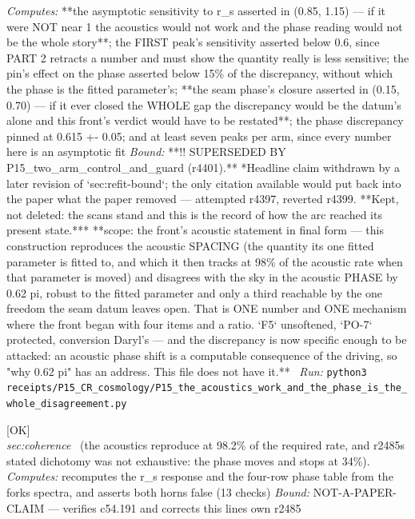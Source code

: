 \begin{description}
\emph{Computes:} **the asymptotic sensitivity to r\_s asserted in (0.85, 1.15) --- if it were NOT near 1 the acoustics would not work and the phase reading would not be the whole story**; the FIRST peak's sensitivity asserted below 0.6, since PART 2 retracts a number and must show the quantity really is less sensitive; the pin's effect on the phase asserted below 15\% of the discrepancy, without which the phase is the fitted parameter's; **the seam phase's closure asserted in (0.15, 0.70) --- if it ever closed the WHOLE gap the discrepancy would be the datum's alone and this front's verdict would have to be restated**; the phase discrepancy pinned at 0.615 +- 0.05; and at least seven peaks per arm, since every number here is an asymptotic fit
 \emph{Bound:} **!! SUPERSEDED BY P15\_two\_arm\_control\_and\_guard (r4401).** *Headline claim withdrawn by a later revision of `sec:refit-bound`; the only citation available would put back into the paper what the paper removed --- attempted r4397, reverted r4399. **Kept, not deleted: the scans stand and this is the record of how the arc reached its present state.*** **scope: the front's acoustic statement in final form --- this construction reproduces the acoustic SPACING (the quantity its one fitted parameter is fitted to, and which it then tracks at 98\% of the acoustic rate when that parameter is moved) and disagrees with the sky in the acoustic PHASE by 0.62 pi, robust to the fitted parameter and only a third reachable by the one freedom the seam datum leaves open. That is ONE number and ONE mechanism where the front began with four items and a ratio. `F5` unsoftened, `PO-7` protected, conversion Daryl's --- and the discrepancy is now specific enough to be attacked: an acoustic phase shift is a computable consequence of the driving, so "why 0.62 pi" has an address. This file does not have it.**
\ \emph{Run:} \texttt{python3 receipts/P15\_CR\_cosmology/P15\_the\_acoustics\_work\_and\_the\_phase\_is\_the\_whole\_disagreement.py}
\item[\label{rcpt:B6_the_acoustics_reproduce_and_my_dichotomy_was_false}\texttt{B6\_the\_acoustics\_reproduce\_and\_my\_dichotomy\_was\_false}]\hfill\textsf{[OK]}\\
\textit{sec:coherence} \ (the acoustics reproduce at 98.2\% of the required rate, and r2485s stated dichotomy was not exhaustive: the phase moves and stops at 34\%). 
\emph{Computes:} recomputes the r\_s response and the four-row phase table from the forks spectra, and asserts both horns false (13 checks)
 \emph{Bound:} NOT-A-PAPER-CLAIM --- verifies c54.191 and corrects this lines own r2485

\end{description}
